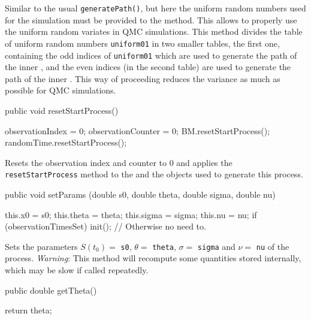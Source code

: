 \begin{tabb} Similar to the usual \texttt{generatePath()}, but here the uniform
random numbers used for the simulation must be provided to the method.  This
allows to properly use the uniform random variates in QMC simulations.
This method divides the table of uniform random
numbers \texttt{uniform01} in two smaller tables, the first one, containing the
odd indices of \texttt{uniform01} which are used to generate the path of the inner
, and the even indices (in the second table) are used to
generate the path of the inner . This way of proceeding
reduces the variance as much as possible for QMC simulations.
\end{tabb}
\begin{code}

    public void resetStartProcess() \begin{hide} {
        observationIndex   = 0;
        observationCounter = 0;
        BM.resetStartProcess();
        randomTime.resetStartProcess();
    }\end{hide}
\end{code}
\begin{tabb} Resets the observation index and counter to 0 and
applies the \texttt{resetStartProcess} method to the
 and the  objects
used to generate this process.
\end{tabb}
\begin{code}

   public void setParams (double s0, double theta, double sigma, double nu) \begin{hide} {
        this.x0    = s0;
        this.theta = theta;
        this.sigma = sigma;
        this.nu    = nu; 
        if (observationTimesSet) init(); // Otherwise no need to.
    }\end{hide}
\end{code}
\begin{tabb}
Sets the parameters
$S(t_{0}) =$ \texttt{s0}, $\theta =$ \texttt{theta}, $\sigma =$ \texttt{sigma}
and $\nu =$ \texttt{nu} of the process.
\emph{Warning}: This method will recompute some quantities stored internally,
which may be slow if called repeatedly.
\end{tabb}
\begin{code}

   public double getTheta() \begin{hide} { return theta; }\end{hide}
\end{code}
